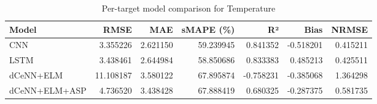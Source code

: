 \begin{table}
\caption{Per-target model comparison for Temperature}
\begin{tabular}{lrrrrrr}
\toprule
Model & RMSE & MAE & sMAPE (\%) & R² & Bias & NRMSE \\
\midrule
CNN & 3.355226 & 2.621150 & 59.239945 & 0.841352 & -0.518201 & 0.415211 \\
LSTM & 3.438461 & 2.644984 & 58.850686 & 0.833383 & 0.485213 & 0.425511 \\
dCeNN+ELM & 11.108187 & 3.580122 & 67.895874 & -0.758231 & -0.385068 & 1.364298 \\
dCeNN+ELM+ASP & 4.736520 & 3.438428 & 67.888419 & 0.680325 & -0.287375 & 0.581735 \\
\bottomrule
\end{tabular}
\end{table}
